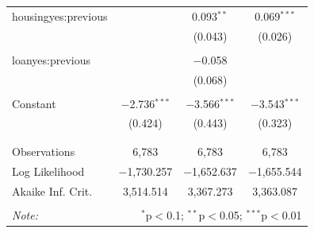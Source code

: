 \documentclass[11pt]{article}
\begin{document}
{\begin{table}[H]
{\begin{tabular}{@{\extracolsep{5pt}}lccc}
 housingyes:previous &  & 0.093$^{**}$ & 0.069$^{***}$ \\ 
  &  & (0.043) & (0.026) \\ 
  & & & \\ 
 loanyes:previous &  & $-$0.058 &  \\ 
  &  & (0.068) &  \\ 
  & & & \\ 
 Constant & $-$2.736$^{***}$ & $-$3.566$^{***}$ & $-$3.543$^{***}$ \\ 
  & (0.424) & (0.443) & (0.323) \\ 
  & & & \\ 
\hline \\[-1.8ex] 
Observations & 6,783 & 6,783 & 6,783 \\ 
Log Likelihood & $-$1,730.257 & $-$1,652.637 & $-$1,655.544 \\ 
Akaike Inf. Crit. & 3,514.514 & 3,367.273 & 3,363.087 \\ 
\hline 
\hline \\[-1.8ex] 
\textit{Note:}  & \multicolumn{3}{r}{$^{*}$p$<$0.1; $^{**}$p$<$0.05; $^{***}$p$<$0.01} \\ 
\end{tabular} 
}
\end{table} 
}
\end{document}

